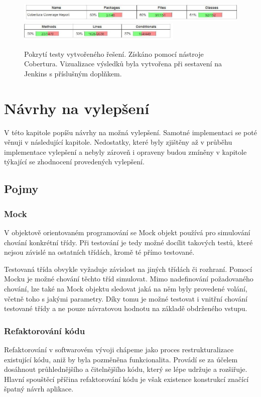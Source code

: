 \documentclass[thesis=B,czech]{FITthesis}[2012/06/26]
\begin{document}
\begin{figure}[h]\centering
 	\includegraphics[width=1.0\textwidth]{resources/cobertura-report-old-1}
 	\includegraphics[width=0.7\textwidth]{resources/cobertura-report-old-2}
	\caption[Pokrytí testy vytvořeného řešení]{Pokrytí testy vytvořeného řešení. Získáno pomocí nástroje Cobertura. Vizualizace
	výsledků byla vytvořena při sestavení na Jenkins s příslušným doplňkem.}\label{fig:dp-dia}
\end{figure}


\chapter{Návrhy na vylepšení}
V této kapitole popíšu návrhy na možná vylepšení. Samotné implementaci se poté věnuji v následující kapitole. 
Nedostatky, které byly zjištěny až v průběhu implementace vylepšení a nebyly zároveň i opraveny budou zmíněny v kapitole týkající se zhodnocení
provedených vylepšení.

\section{Pojmy}

\subsection{Mock}
V objektově orientovaném programování se Mock objekt používá pro simulování chování konkrétní třídy.\cite{mock}
Při testování je tedy možné docílit takových testů, které nejsou závislé na ostatních třídách, kromě té přímo testované.
\par
Testovaná třída obvykle vyžaduje závislost na jiných třídách či rozhraní. Pomocí Mocku je možné chování těchto tříd simulovat.
Mimo nadefinování požadovaného chování, lze také na Mock objektu sledovat jaká na něm byly provedené volání, včetně toho
s jakými parametry. Díky tomu je možné testovat i vnitřní chování testované třídy a ne pouze návratovou hodnotu na základě 
obdrženého vstupu.

\subsection{Refaktorování kódu}
Refaktorování v softwarovém vývoji chápeme jako proces restrukturalizace existující kódu, aniž by byla 
pozměněna funkcionalita. Provádí se za účelem dosáhnout průhlednějšího a čitelnějšího kódu, který
se lépe udržuje a rozšiřuje. \cite{refaktoring} Hlavní spouštěcí příčina refaktorování kódu je však existence 
konstrukcí značící špatný návrh aplikace. 
\end{document}
